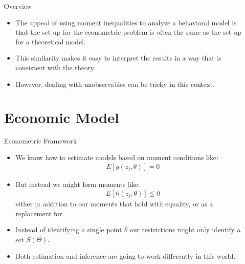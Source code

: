 \documentclass[aspectratio=169,11pt]{beamer}
\begin{document}
\begin{frame}{Overview}
\begin{itemize}
\item The appeal of using moment inequalities to analyze a behavioral model is
that the set up for the econometric problem is often the same as the set up for a
theoretical model.
\vspace{0.1in}
\item This similarity makes it easy to interpret the results in a way that
is consistent with the theory.
\vspace{0.1in}
\item However, dealing with unobservables can be tricky in this context.
\end{itemize}
\end{frame}

\section{Economic Model}

\begin{frame}{Econometric Framework}
\begin{itemize}
\item We know how to estimate models based on moment conditions like:
\begin{eqnarray*}
E[g(z_i, \theta)] = 0
\end{eqnarray*}
\item But instead we might form moments like:
\begin{eqnarray*}
E[h(z_i, \theta)] \leq 0
\end{eqnarray*}
either in addition to our moments that hold with equality, or as a replacement for.
\item Instead of identifying a single point $\hat{\theta}$ our restrictions might only \alert{identify a set} $S(\Theta)$.
\item Both estimation and inference are going to work differently in this world.
\end{itemize}
\end{frame}

\end{document}
